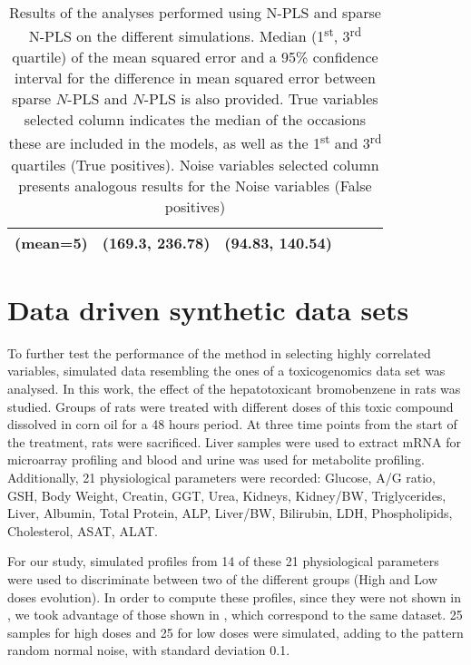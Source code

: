 \begin{table}[hbtp]
{\begin{tabular}{@{}lccccc@{}}
(mean=5)             & (169.3, 236.78)  & (94.83, 140.54) &                                                                           &                                                                            &                                                                             \\ \bottomrule
\end{tabular}%
}
\caption[Results of the analyses performed using $N$-PLS and sparse $N$-PLS on the different synthetic simulations]{Results of the analyses performed using N-PLS and sparse N-PLS on the different simulations. Median (1\textsuperscript{st}, 3\textsuperscript{rd} quartile) of the mean squared error and a 95\% confidence interval for the difference in mean squared error between sparse $N$-PLS and $N$-PLS is also provided. True variables selected column indicates the median of the occasions these are included in the models, as well as the 1\textsuperscript{st} and 3\textsuperscript{rd} quartiles (True positives). Noise variables selected column presents analogous results for the Noise variables (False positives)}
\label{table:results_synthetic}
\end{table}

\section{Data driven synthetic data sets}
To further test the performance of the method in selecting highly correlated variables, simulated data resembling the ones of a  toxicogenomics data set \parencite{heijne2004bromobenzene} was analysed. In this work, the effect of the hepatotoxicant bromobenzene in rats was studied. Groups of rats were treated with different doses of this toxic compound dissolved in corn oil for a 48 hours period. At three time points from the start of the treatment, rats were sacrificed. Liver samples were used to extract mRNA for microarray profiling and blood and urine was used for metabolite profiling. Additionally, 21 physiological parameters were recorded: Glucose, A/G ratio, GSH, Body Weight, Creatin, GGT, Urea, Kidneys, Kidney/BW, Triglycerides, Liver, Albumin, Total Protein, ALP, Liver/BW, Bilirubin, LDH, Phospholipids, Cholesterol, ASAT, ALAT. 

For our study, simulated profiles from 14 of these 21 physiological parameters were used to discriminate between two of the different groups (High and Low doses evolution). In order to compute these profiles, since they were not shown in \parencite{heijne2004bromobenzene}, we took advantage of those shown in \cite{conesa2010multiway}, which correspond to the same dataset. 25 samples for high doses and 25 for low doses were simulated, adding to the pattern random normal noise, with standard deviation 0.1.

